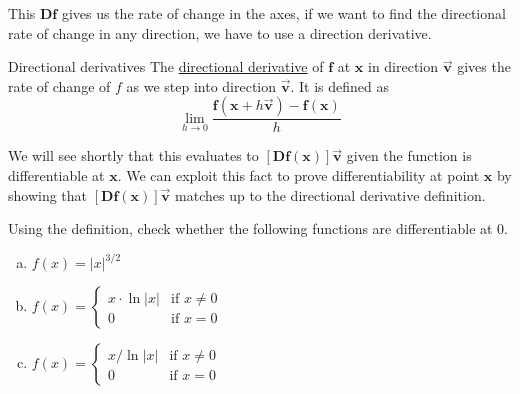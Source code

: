 This $\bm{Df}$ gives us the rate of change in the axes, if we want to find the directional rate of change in any direction, we have to use a direction derivative.

\begin{defn}{Directional derivatives}
The \ul{directional derivative} of $\bm{f}$ at $\bm{x}$ in direction $\vec{\bm{v}}$ gives the rate of change of $f$ as we step into direction $\vec{\bm{v}}$. It is defined as
\[\lim_{h\to 0}\frac{\bm{f}(\bm{x}+h\vec{\bm{v}})-\bm{f}(\bm{x})}{h}\]
\end{defn}

We will see shortly that this evaluates to $[\bm{Df}(\bm{x})]\vec{\bm{v}}$ given the function is differentiable at $\bm{x}$. We can exploit this fact to prove differentiability at point $\bm{x}$ by showing that $[\bm{Df}(\bm{x})]\vec{\bm{v}}$ matches up to the directional derivative definition. 

 Using the definition, check whether the following functions are differentiable at 0.
\begin{enumerate}[a.]
  \item $f(x) = |x|^{3/2}$ \\
  \item $\displaystyle f(x) = \begin{cases}x \cdot \ln{|x|} & \text{if } x \neq 0 \\ 0 & \text{if } x = 0 \end{cases}$ \\
  \item $\displaystyle f(x) = \begin{cases}x/ \ln{|x|} & \text{if } x \neq 0 \\ 0 & \text{if } x = 0\end{cases}$ \\
\end{enumerate}
